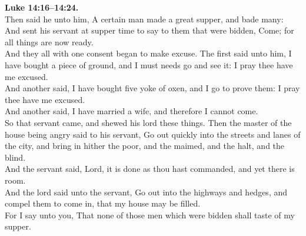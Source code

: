 \documentclass[12pt]{article} %
\begin{document}
{\begin{minipage}[t]{0.45\textwidth}
\textbf{Luke 14:16--14:24.}\\
Then said he unto him, A certain man made a great supper, and bade many:\\
And sent his servant at supper time to say to them that were bidden, Come; for all things are now ready.\\
And they all with one consent began to make excuse. The first said unto him, I have bought a piece of ground, and I must needs go and see it: I pray thee have me excused.\\
And another said, I have bought five yoke of oxen, and I go to prove them: I pray thee have me excused.\\
And another said, I have married a wife, and therefore I cannot come.\\
So that servant came, and shewed his lord these things. Then the master of the house being angry said to his servant, Go out quickly into the streets and lanes of the city, and bring in hither the poor, and the maimed, and the halt, and the blind.\\
And the servant said, Lord, it is done as thou hast commanded, and yet there is room.\\
And the lord said unto the servant, Go out into the highways and hedges, and compel them to come in, that my house may be filled.\\
For I say unto you, That none of those men which were bidden shall taste of my supper.\\

\end{minipage}}
\vspace*{\fill}
\newpage
\huge%
\vspace*{\fill}
\begin{spacing}{1.2}
\end{spacing}
\vspace*{\fill}
\end{document}
